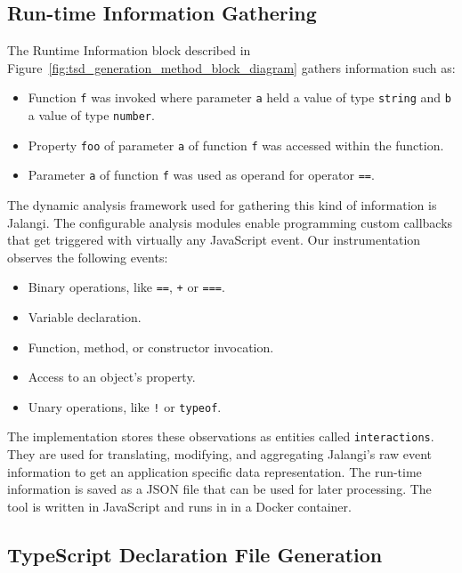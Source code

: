 \documentclass[a4paper,english,cleveref, autoref]{lipics-v2019}
\newcommand{\figref}[1]{Figure~\ref{#1}}
\begin{document}
\subsection{Run-time Information Gathering}
The Runtime Information block described in
\figref{fig:tsd_generation_method_block_diagram} gathers
information such as: 

\begin{itemize}
  \item Function \lstinline{f} was invoked where parameter
    \lstinline{a} held a value of type \lstinline{string} and
    \lstinline{b} a value of type \lstinline{number}. 
  \item Property \lstinline{foo} of parameter \lstinline{a} of
    function \lstinline{f} was accessed within the function. 
  \item Parameter \lstinline{a} of function \lstinline{f} was used as
    operand for operator \lstinline{==}. 
\end{itemize}

The dynamic analysis framework used for gathering this kind of
information is Jalangi. The configurable analysis modules enable
programming custom callbacks that get triggered with virtually any
JavaScript event. Our instrumentation observes the following events: 
\begin{itemize}
  \item Binary operations, like \lstinline{==}, \lstinline{+} or
    \lstinline{===}.  
  \item Variable declaration.
  \item Function, method, or constructor invocation.
  \item Access to an object's property.
  \item Unary operations, like \lstinline{!} or \lstinline{typeof}.
\end{itemize}

The implementation stores these observations as entities called
\texttt{interactions}. They are used for translating, modifying, and
aggregating Jalangi's raw event information to get an application
specific data representation. The run-time information is saved as a
JSON file that can be used for later processing. The tool is written
in JavaScript and runs in \NodeJS{} in a Docker container. 

\subsection{TypeScript Declaration File Generation}
\label{sec:typescr-decl-file}
\end{document}
